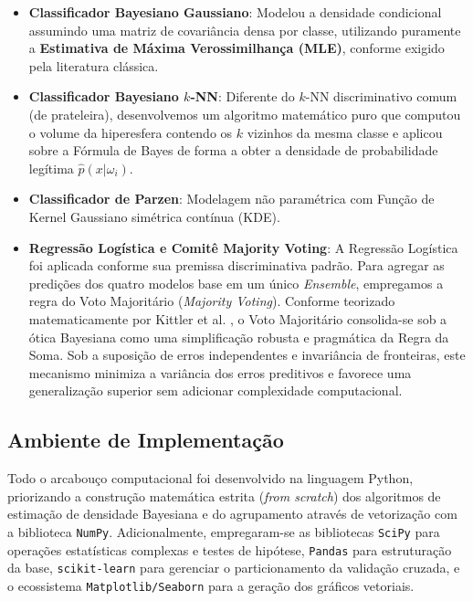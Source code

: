 \documentclass[12pt,a4paper]{article}
\begin{document}
\begin{itemize}
    \item \textbf{Classificador Bayesiano Gaussiano}: Modelou a densidade condicional assumindo uma matriz de covariância densa por classe, utilizando puramente a \textbf{Estimativa de Máxima Verossimilhança (MLE)}, conforme exigido pela literatura clássica.
    
    \item \textbf{Classificador Bayesiano $k$-NN}: Diferente do $k$-NN discriminativo comum (de prateleira), desenvolvemos um algoritmo matemático puro que computou o volume da hiperesfera contendo os $k$ vizinhos da mesma classe e aplicou sobre a Fórmula de Bayes de forma a obter a densidade de probabilidade legítima $\hat{p}(x|\omega_i)$.
    
    \item \textbf{Classificador de Parzen}: Modelagem não paramétrica com Função de Kernel Gaussiano simétrica contínua (KDE).
    
    \item \textbf{Regressão Logística e Comitê Majority Voting}: A Regressão Logística foi aplicada conforme sua premissa discriminativa padrão. Para agregar as predições dos quatro modelos base em um único \textit{Ensemble}, empregamos a regra do Voto Majoritário (\textit{Majority Voting}). Conforme teorizado matematicamente por Kittler et al. \cite{kittler1998}, o Voto Majoritário consolida-se sob a ótica Bayesiana como uma simplificação robusta e pragmática da Regra da Soma. Sob a suposição de erros independentes e invariância de fronteiras, este mecanismo minimiza a variância dos erros preditivos e favorece uma generalização superior sem adicionar complexidade computacional.
\end{itemize}

\subsection{Ambiente de Implementação}
Todo o arcabouço computacional foi desenvolvido na linguagem Python, priorizando a construção matemática estrita (\textit{from scratch}) dos algoritmos de estimação de densidade Bayesiana e do agrupamento através de vetorização com a biblioteca \texttt{NumPy}. Adicionalmente, empregaram-se as bibliotecas \texttt{SciPy} para operações estatísticas complexas e testes de hipótese, \texttt{Pandas} para estruturação da base, \texttt{scikit-learn} para gerenciar o particionamento da validação cruzada, e o ecossistema \texttt{Matplotlib/Seaborn} para a geração dos gráficos vetoriais.
\end{document}
